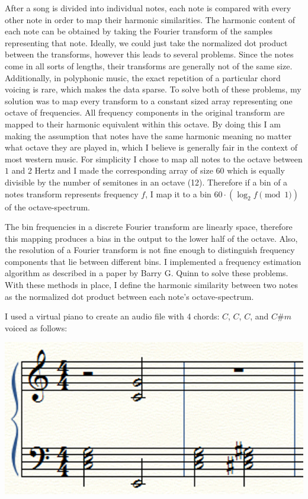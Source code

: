 \documentclass{amsart}
\theoremstyle{definition}
\begin{document}
After a song is divided into individual notes, each note is compared with every other note
in order to map their harmonic similarities.
The harmonic content of each note can be obtained by taking the Fourier transform of the samples representing that note.
Ideally, 
we could just take the normalized dot product between the transforms, 
however this leads to several problems.
Since the notes come in all sorts of lengths, their transforms are generally not of the same size.
Additionally, in polyphonic music, the exact repetition of a particular chord voicing is rare, which makes the data sparse.
To solve both of these problems, my solution was to map every transform to a constant sized array
representing one octave of frequencies. 
All frequency components in the original transform are mapped to their harmonic equivalent within this octave.
By doing this I am making the assumption that notes have the same harmonic meaning
no matter what octave they are played in,
which I believe is generally fair in the context of most western music.
For simplicity I chose to map all notes to the octave between $1$ and 2 Hertz and 
I made the corresponding array of size 60
which is equally divisible by the number of semitones in an octave (12).
Therefore if a bin of a notes transform represents frequency $f$, I map it to a bin 
$
  60\cdot(\log_2 f \pmod 1)
$
of the octave-spectrum.

The bin frequencies in a discrete Fourier transform are linearly space,
therefore this mapping produces a bias in the output to the lower half of the octave.
Also, the resolution of a Fourier transform is not fine enough to distinguish frequency components that lie between different bins.
I implemented a frequency estimation algorithm as described in a paper by Barry G. Quinn\cite{freqEst} to solve these problems.
With these methods in place,
I define the harmonic similarity between two notes as the
normalized dot product between each note's octave-spectrum.

I used a virtual piano to create an audio file with 4 chords: $C$, $C$, $C$, and $C\#m$ voiced as follows:

{\centering
\begin{center}
  \includegraphics[scale = 0.5]{chords}
\end{center}
}
\end{document}
